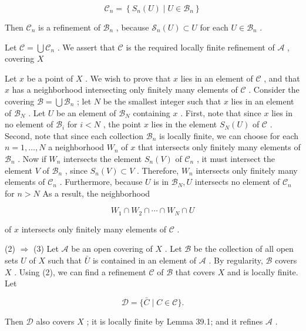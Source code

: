 \documentclass[10pt]{article}
\begin{document}
\[
{\mathcal{C}}_{n} = \left\{  {{S}_{n}\left( U\right)  \mid  U \in  {\mathcal{B}}_{n}}\right\}
\]

Then \({\mathcal{C}}_{n}\) is a refinement of \({\mathcal{B}}_{n}\) , because \({\mathcal{S}}_{n}\left( U\right)  \subset  U\) for each \(U \in  {\mathcal{B}}_{n}\) .

Let \(\mathcal{C} = \bigcup {\mathcal{C}}_{n}\) . We assert that \(\mathcal{C}\) is the required locally finite refinement of \(\mathcal{A}\) , covering \(X\)

Let \(x\) be a point of \(X\) . We wish to prove that \(x\) lies in an element of \(\mathcal{C}\) , and that \(x\) has a neighborhood intersecting only finitely many elements of \(\mathcal{C}\) . Consider the covering \(\mathcal{B} = \bigcup {\mathcal{B}}_{n}\) ; let \(N\) be the smallest integer such that \(x\) lies in an element of \({\mathcal{B}}_{N}\) . Let \(U\) be an element of \({\mathcal{B}}_{N}\) containing \(x\) . First, note that since \(x\) lies in no element of \({\mathcal{B}}_{i}\) for \(i < N\) , the point \(x\) lies in the element \({S}_{N}\left( U\right)\) of \(\mathcal{C}\) . Second, note that since each collection \({\mathcal{B}}_{n}\) is locally finite, we can choose for each \(n = 1,\ldots ,N\) a neighborhood \({W}_{n}\) of \(x\) that intersects only finitely many elements of \({\mathcal{B}}_{n}\) . Now if \({W}_{n}\) intersects the element \({S}_{n}\left( V\right)\) of \({\mathcal{C}}_{n}\) , it must intersect the element \(V\) of \({\mathcal{B}}_{n}\) , since \({S}_{n}\left( V\right)  \subset  V\) . Therefore, \({W}_{n}\) intersects only finitely many elements of \({\mathcal{C}}_{n}\) . Furthermore, because \(U\) is in \({\mathcal{B}}_{N},U\) intersects no element of \({\mathcal{C}}_{n}\) for \(n > N\) As a result, the neighborhood

\[
{W}_{1} \cap  {W}_{2} \cap  \cdots  \cap  {W}_{N} \cap  U
\]

of \(x\) intersects only finitely many elements of \(\mathcal{C}\) .

(2) \(\Rightarrow\) (3) Let \(\mathcal{A}\) be an open covering of \(X\) . Let \(\mathcal{B}\) be the collection of all open sets \(U\) of \(X\) such that \(\bar{U}\) is contained in an element of \(\mathcal{A}\) . By regularity, \(\mathcal{B}\) covers \(X\) . Using (2), we can find a refinement \(\mathcal{C}\) of \(\mathcal{B}\) that covers \(X\) and is locally finite. Let

\[
\mathcal{D} = \{ \bar{C} \mid  C \in  \mathcal{C}\} .
\]

Then \(\mathcal{D}\) also covers \(X\) ; it is locally finite by Lemma 39.1; and it refines \(\mathcal{A}\) .
\end{document}

